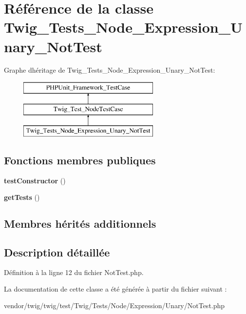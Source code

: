 \hypertarget{class_twig___tests___node___expression___unary___not_test}{}\section{Référence de la classe Twig\+\_\+\+Tests\+\_\+\+Node\+\_\+\+Expression\+\_\+\+Unary\+\_\+\+Not\+Test}
\label{class_twig___tests___node___expression___unary___not_test}
Graphe d\textquotesingle{}héritage de Twig\+\_\+\+Tests\+\_\+\+Node\+\_\+\+Expression\+\_\+\+Unary\+\_\+\+Not\+Test\+:\begin{figure}[H]
\begin{center}
\leavevmode
\includegraphics[height=3.000000cm]{class_twig___tests___node___expression___unary___not_test}
\end{center}
\end{figure}
\subsection*{Fonctions membres publiques}
\begin{DoxyCompactItemize}
\item 
{\bfseries test\+Constructor} ()\hypertarget{class_twig___tests___node___expression___unary___not_test_a47094dc941e72950570900d1418f89c6}{}\label{class_twig___tests___node___expression___unary___not_test_a47094dc941e72950570900d1418f89c6}

\item 
{\bfseries get\+Tests} ()\hypertarget{class_twig___tests___node___expression___unary___not_test_a7e247dd31cc8d37a6c97353a062a0080}{}\label{class_twig___tests___node___expression___unary___not_test_a7e247dd31cc8d37a6c97353a062a0080}

\end{DoxyCompactItemize}
\subsection*{Membres hérités additionnels}


\subsection{Description détaillée}


Définition à la ligne 12 du fichier Not\+Test.\+php.



La documentation de cette classe a été générée à partir du fichier suivant \+:\begin{DoxyCompactItemize}
\item 
vendor/twig/twig/test/\+Twig/\+Tests/\+Node/\+Expression/\+Unary/Not\+Test.\+php\end{DoxyCompactItemize}
